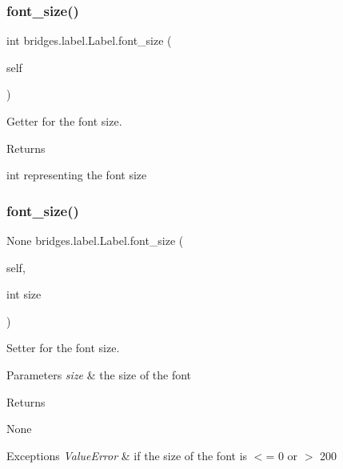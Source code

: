\subsubsection{\texorpdfstring{font\_size()}{font\_size()}\hspace{0.1cm}{\footnotesize\ttfamily [1/2]}}
{\footnotesize\ttfamily  int bridges.\+label.\+Label.\+font\+\_\+size (\begin{DoxyParamCaption}\item[{}]{self }\end{DoxyParamCaption})}



Getter for the font size. 

\begin{DoxyReturn}{Returns}


int representing the font size 
\end{DoxyReturn}
\mbox{\label{classbridges_1_1label_1_1_label_a56c3981068c522777f73e57fcd111c58}} 
\subsubsection{\texorpdfstring{font\_size()}{font\_size()}\hspace{0.1cm}{\footnotesize\ttfamily [2/2]}}
{\footnotesize\ttfamily  None bridges.\+label.\+Label.\+font\+\_\+size (\begin{DoxyParamCaption}\item[{}]{self,  }\item[{int}]{size }\end{DoxyParamCaption})}



Setter for the font size. 


\begin{DoxyParams}{Parameters}
{\em size} & the size of the font \\
\hline
\end{DoxyParams}
\begin{DoxyReturn}{Returns}


None
\end{DoxyReturn}

\begin{DoxyExceptions}{Exceptions}
{\em Value\+Error} & if the size of the font is $<$= 0 or $>$ 200 \\
\hline
\end{DoxyExceptions}
\mbox{\label{classbridges_1_1label_1_1_label_a627bc596c7e3db837e3b1575282e1b98}} 
